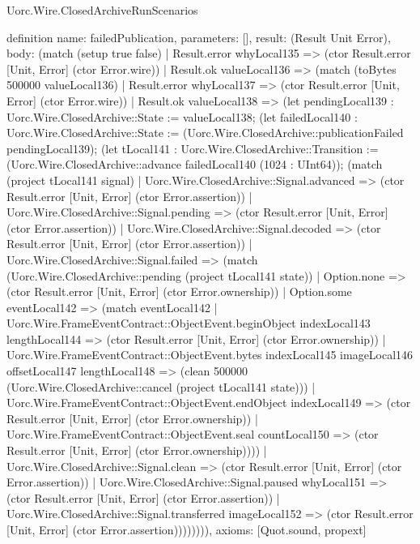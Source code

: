 \begin{lexlean}{Uorc.Wire.ClosedArchiveRunScenarios}
\begin{semanticmodule}
definition{
  name: failedPublication,
  parameters: [],
  result: (Result Unit Error),
  body: (match (setup true false)
    | Result.error whyLocal135 => (ctor Result.error [Unit, Error] (ctor Error.wire))
    | Result.ok valueLocal136 => (match (toBytes 500000 valueLocal136)
      | Result.error whyLocal137 => (ctor Result.error [Unit, Error] (ctor Error.wire))
      | Result.ok valueLocal138 => (let pendingLocal139 : Uorc.Wire.ClosedArchive::State := valueLocal138; (let failedLocal140 : Uorc.Wire.ClosedArchive::State := (Uorc.Wire.ClosedArchive::publicationFailed pendingLocal139); (let tLocal141 : Uorc.Wire.ClosedArchive::Transition := (Uorc.Wire.ClosedArchive::advance failedLocal140 (1024 : UInt64)); (match (project tLocal141 signal)
        | Uorc.Wire.ClosedArchive::Signal.advanced => (ctor Result.error [Unit, Error] (ctor Error.assertion))
        | Uorc.Wire.ClosedArchive::Signal.pending => (ctor Result.error [Unit, Error] (ctor Error.assertion))
        | Uorc.Wire.ClosedArchive::Signal.decoded => (ctor Result.error [Unit, Error] (ctor Error.assertion))
        | Uorc.Wire.ClosedArchive::Signal.failed => (match (Uorc.Wire.ClosedArchive::pending (project tLocal141 state))
          | Option.none => (ctor Result.error [Unit, Error] (ctor Error.ownership))
          | Option.some eventLocal142 => (match eventLocal142
            | Uorc.Wire.FrameEventContract::ObjectEvent.beginObject indexLocal143 lengthLocal144 => (ctor Result.error [Unit, Error] (ctor Error.ownership))
            | Uorc.Wire.FrameEventContract::ObjectEvent.bytes indexLocal145 imageLocal146 offsetLocal147 lengthLocal148 => (clean 500000 (Uorc.Wire.ClosedArchive::cancel (project tLocal141 state)))
            | Uorc.Wire.FrameEventContract::ObjectEvent.endObject indexLocal149 => (ctor Result.error [Unit, Error] (ctor Error.ownership))
            | Uorc.Wire.FrameEventContract::ObjectEvent.seal countLocal150 => (ctor Result.error [Unit, Error] (ctor Error.ownership))))
        | Uorc.Wire.ClosedArchive::Signal.clean => (ctor Result.error [Unit, Error] (ctor Error.assertion))
        | Uorc.Wire.ClosedArchive::Signal.paused whyLocal151 => (ctor Result.error [Unit, Error] (ctor Error.assertion))
        | Uorc.Wire.ClosedArchive::Signal.transferred imageLocal152 => (ctor Result.error [Unit, Error] (ctor Error.assertion)))))))),
  axioms: [Quot.sound, propext]
}


\end{semanticmodule}
\end{lexlean}
